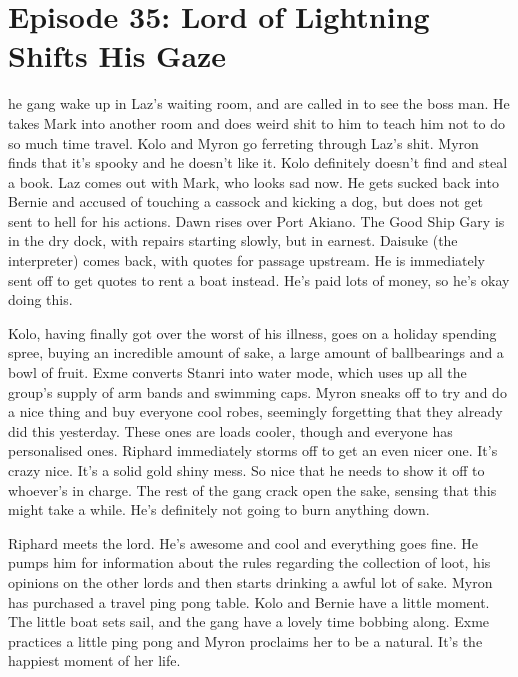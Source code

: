 \section{Episode 35: Lord of Lightning Shifts His Gaze}

\begin{multicols}{2}

he gang wake up in Laz’s waiting room, and are called in to see the boss man. He takes Mark into another room and does weird shit to him to teach him not to do so much time travel. Kolo and Myron go ferreting through Laz’s shit. Myron finds that it’s spooky and he doesn’t like it. Kolo definitely doesn’t find and steal a book. Laz comes out with Mark, who looks sad now. He gets sucked back into Bernie and accused of touching a cassock and kicking a dog, but does not get sent to hell for his actions. Dawn rises over Port Akiano. The Good Ship Gary is in the dry dock, with repairs starting slowly, but in earnest. Daisuke (the interpreter) comes back, with quotes for passage upstream. He is immediately sent off to get quotes to rent a boat instead. He’s paid lots of money, so he’s okay doing this.\medskip

Kolo, having finally got over the worst of his illness, goes on a holiday spending spree, buying an incredible amount of sake, a large amount of ballbearings and a bowl of fruit. Exme converts Stanri into water mode, which uses up all the group’s supply of arm bands and swimming caps. Myron sneaks off to try and do a nice thing and buy everyone cool robes, seemingly forgetting that they already did this yesterday. These ones are loads cooler, though and everyone has personalised ones. Riphard immediately storms off to get an even nicer one. It’s crazy nice. It’s a solid gold shiny mess. So nice that he needs to show it off to whoever’s in charge. The rest of the gang crack open the sake, sensing that this might take a while. He’s definitely not going to burn anything down.\medskip

Riphard meets the lord. He’s awesome and cool and everything goes fine. He pumps him for information about the rules regarding the collection of loot, his opinions on the other lords and then starts drinking a awful lot of sake. Myron has purchased a travel ping pong table. Kolo and Bernie have a little moment. The little boat sets sail, and the gang have a lovely time bobbing along. Exme practices a little ping pong and Myron proclaims her to be a natural. It’s the happiest moment of her life.\medskip


\end{multicols}
